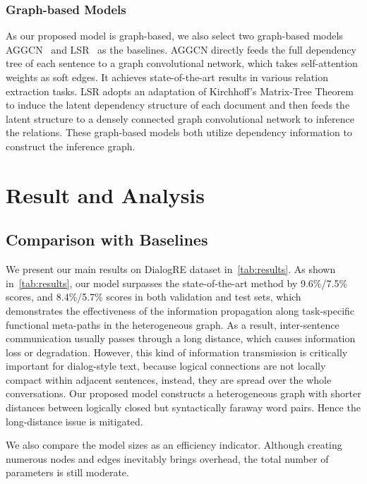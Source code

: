 \documentclass[11pt]{article}
\begin{document}
\subsubsection{Graph-based Models}
As our proposed model is graph-based, we also select two graph-based models AGGCN~\cite{guo2019attention} and LSR~\cite{nan2020reasoning} as the baselines. AGGCN directly feeds the full dependency tree of each sentence to a graph convolutional network, which takes self-attention weights as soft edges. It achieves state-of-the-art results in various relation extraction tasks. LSR adopts an adaptation of Kirchhoff’s Matrix-Tree Theorem~\cite{tutte1984graph,koo2007structured} to induce the latent dependency structure of each document and then feeds the latent structure to a densely connected graph convolutional network to inference the relations. These graph-based models both utilize dependency information to construct the inference graph.

\section{Result and Analysis}
\label{result}
\subsection{Comparison with Baselines}
We present our main results on DialogRE dataset in~\cref{tab:results}. As shown in~\cref{tab:results}, our model surpasses the state-of-the-art method by 9.6\%/7.5\%  scores, and 8.4\%/5.7\%  scores in both validation and test sets, which demonstrates the effectiveness of the information propagation along task-specific functional meta-paths in the heterogeneous graph.
As a result, inter-sentence communication usually passes through a long distance, which causes information loss or degradation.
However, this kind of information transmission is critically important for dialog-style text, because logical connections are not locally compact within adjacent sentences,
instead, they are spread over the whole conversations.
Our proposed model constructs a heterogeneous graph with shorter distances between logically closed but syntactically faraway word pairs.
Hence the long-distance issue is mitigated.
\par
We also compare the model sizes as an efficiency indicator.
Although creating numerous nodes and edges inevitably brings overhead, the total number of parameters is still moderate.
\end{document}
